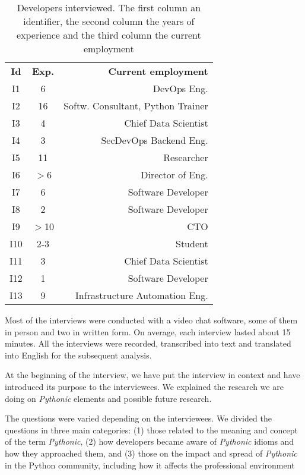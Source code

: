\documentclass[a4paper]{article}
\begin{document}
\begin{table}
    \centering
    \begin{tabular}{c c r}
        
        \textbf{Id} & \textbf{Exp.} & \textbf{Current employment} \\
        
        I1 &  6 & DevOps Eng. \\
        I2 & 16 & Softw. Consultant, Python Trainer \\
        I3 &  4 & Chief Data Scientist \\
        I4 &  3 & SecDevOps Backend Eng. \\
        I5 & 11 & Researcher \\
        I6 & $>$6 & Director of Eng. \\
        I7 &  6 & Software Developer \\
        I8 &  2  & Software Developer \\
        I9 & $>$10 & CTO \\
        I10 & 2-3 & Student \\
        I11 & 3 & Chief Data Scientist \\
        I12 & 1 & Software Developer \\
        I13 & 9 & Infrastructure Automation Eng. \\ 
    \end{tabular}
    \caption{Developers interviewed. The first column an identifier, the second column the years of experience and the third column the current employment}
    \label{tab:interviewees}
\end{table}

Most of the interviews were conducted with a video chat software, some of them in person and two in written form. On average, each interview lasted about 15 minutes. All the interviews were recorded, transcribed into text and translated into English for the subsequent analysis.

At the beginning of the interview, we have put the interview in context and have introduced its purpose to the interviewees. We explained the research we are doing on \textit{Pythonic} elements and possible future research.

The questions were varied depending on the interviewees. We divided the questions in three main categories: (1) those related to
the meaning and concept of the term \textit{Pythonic}, (2) how developers became aware of \textit{Pythonic} idioms and how they approached them, and (3) those on the impact and spread of \textit{Pythonic} in the Python community, including how it affects the professional environment
\end{document}
